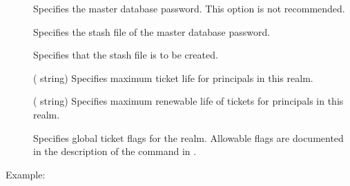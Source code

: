\documentclass[letterpaper,10pt,english]{sphinxmanual}
\begin{document}
\begin{description}
\item[{ }] \leavevmode
\sphinxAtStartPar
Specifies the master database password. This option is not
recommended.

\item[{ }] \leavevmode
\sphinxAtStartPar
Specifies the stash file of the master database password.

\item[{}] \leavevmode
\sphinxAtStartPar
Specifies that the stash file is to be created.

\item[{ }] \leavevmode
\sphinxAtStartPar
( string) Specifies maximum ticket life for
principals in this realm.

\item[{ }] \leavevmode
\sphinxAtStartPar
( string) Specifies maximum renewable life of
tickets for principals in this realm.

\item[{}] \leavevmode
\sphinxAtStartPar
Specifies global ticket flags for the realm.  Allowable flags are
documented in the description of the  command in
{\hyperref[\detokenize{admin/admin_commands/kadmin_local:kadmin-1}]{}}.

\end{description}

\sphinxAtStartPar
Example:
\end{document}
